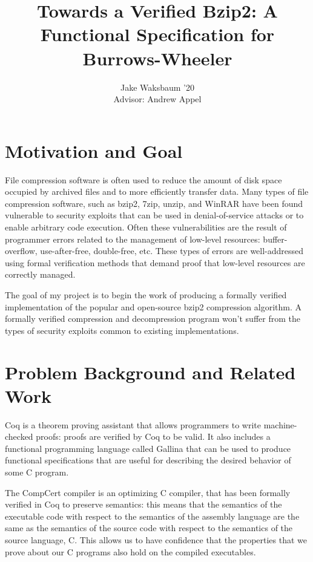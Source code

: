 \documentclass{article}
\title{Towards a Verified Bzip2: A Functional Specification for Burrows-Wheeler}
\author{Jake Waksbaum '20\\Advisor: Andrew Appel}
\date{}
\begin{document}
\maketitle

\section{Motivation and Goal}
File compression software is often used to reduce the amount of disk
space occupied by archived files and to more efficiently transfer
data. Many types of file compression software, such as
bzip2\cite{bzip2}, 7zip\cite{7zip}, unzip\cite{infozip}, and
WinRAR\cite{winrar} have been found vulnerable to security exploits
that can be used in denial-of-service attacks or to enable arbitrary
code execution. Often these vulnerabilities are the result of
programmer errors related to the management of low-level resources:
buffer-overflow, use-after-free, double-free, etc. These types of
errors are well-addressed using formal verification methods that
demand proof that low-level resources are correctly managed.

The goal of my project is to begin the work of producing a formally
verified implementation of the popular and open-source bzip2
compression algorithm. A formally verified compression and
decompression program won't suffer from the types of security exploits
common to existing implementations.

\section{Problem Background and Related Work}
Coq is a theorem proving assistant that allows programmers to write
machine-checked proofs: proofs are verified by Coq to be valid. It
also includes a functional programming language called Gallina that
can be used to produce functional specifications\cite{7536361} that
are useful for describing the desired behavior of some C program.

The CompCert
compiler\cite{Stewart:2015:CC:2676726.2676985,leroy:inria-00000963} is
an optimizing C compiler, that has been formally verified in Coq to
preserve semantics: this means that the semantics of the executable
code with respect to the semantics of the assembly language are the
same as the semantics of the source code with respect to the semantics
of the source language, C. This allows us to have confidence that the
properties that we prove about our C programs also hold on the
compiled executables.
\end{document}
